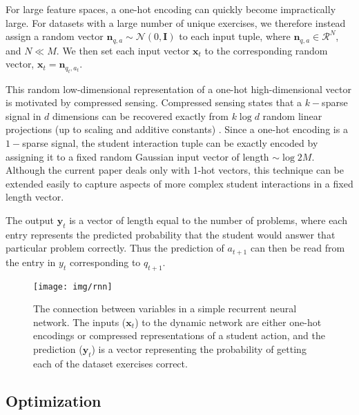 \documentclass{article} \usepackage{nips,times}
\newcommand{\mb}{\mathbf}
\newcommand{\mc}{\mathcal}
\begin{document}
For large feature spaces, a one-hot encoding can quickly become impractically large.
For datasets with a large number of unique exercises, we therefore instead assign a random vector $\mb n_{q, a} \sim \mc N\left(0, \mb I\right)$ to each input tuple, where $\mb n_{q, a} \in \mc R^N$, and $N \ll M$. We then set each input vector $\mb x_t$ to the corresponding random vector, $\mb x_t = \mb n_{q_t, a_t}$.

This random low-dimensional representation of a one-hot high-dimensional vector is motivated by compressed sensing.
Compressed sensing states that a $k-$sparse signal in $d$ dimensions can be recovered exactly from $k \log d$ random linear projections (up to scaling and additive constants) \cite{baraniuk2007compressive}. Since a one-hot encoding is a $1-$sparse signal, the student interaction tuple can be exactly encoded by assigning it to a fixed random Gaussian input vector of length $\sim \log 2M$.
Although the current paper deals only with 1-hot vectors, this technique can be extended easily to capture aspects of more complex student interactions in a fixed length vector.


The output $\mb y_t$ is a vector of length equal to the number of problems, where each entry represents the predicted probability that the student would answer that particular problem correctly.
Thus the prediction of $a_{t+1}$ can then be read from the entry in $y_{t}$ corresponding to $q_{t+1}$.


\begin{figure}[t]
\begin{center}
\texttt{[image: img/rnn]}
\end{center}
\caption{The connection between variables in a simple recurrent neural network. The inputs ($\mb x_t$) to the dynamic network are either one-hot encodings or compressed representations of a student action, and the prediction ($\mb y_t$) is a vector representing the probability of getting each of the dataset exercises correct.
\label{fig:rnn}
}
\vspace{-3mm}
\end{figure}

\subsection{Optimization}
\end{document}
